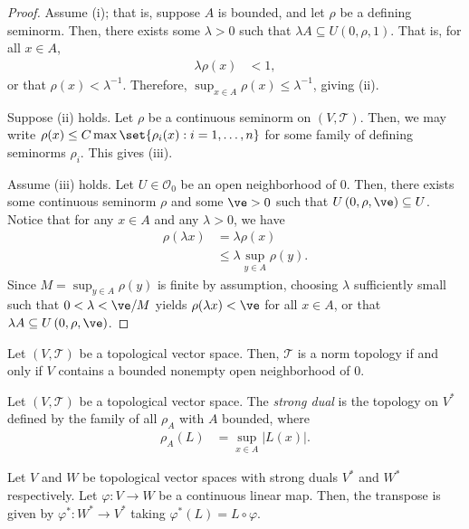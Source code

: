 \documentclass[10pt]{mypackage}
\begin{document}
\begin{proof}
  Assume (i); that is, suppose $A$ is bounded, and let $\rho$ be a defining seminorm. Then, there exists some $\lambda > 0$ such that $\lambda A\subseteq U\left( 0,\rho,1 \right)$. That is, for all $x\in A$,
  \begin{align*}
    \lambda \rho(x) &< 1,
  \end{align*}
  or that $\rho(x) < \lambda^{-1}$. Therefore, $\sup_{x\in A}\rho(x) \leq \lambda^{-1}$, giving (ii).

  Suppose (ii) holds. Let $\rho$ be a continuous seminorm on $\left( V,\mathcal{T} \right)$. Then, we may write $\rho(x) \leq C\max\set{\rho_i(x) : i=1,\dots,n}$ for some family of defining seminorms $\rho_i$. This gives (iii).

  Assume (iii) holds. Let $U\in \mathcal{O}_0$ be an open neighborhood of $0$. Then, there exists some continuous seminorm $\rho$ and some $\ve > 0$ such that $U\left( 0,\rho,\ve \right)\subseteq U$. Notice that for any $x\in A$ and any $\lambda > 0$, we have
  \begin{align*}
    \rho\left( \lambda x \right) &= \lambda \rho(x)\\
                                 &\leq \lambda \sup_{y\in A}\rho(y).
  \end{align*}
  Since $M = \sup_{y\in A}\rho(y)$ is finite by assumption, choosing $\lambda$ sufficiently small such that $0 < \lambda < \ve/M$ yields $\rho(\lambda x) < \ve$ for all $x\in A$, or that $\lambda A \subseteq U\left( 0,\rho,\ve \right)$.
\end{proof}
\begin{theorem}
  Let $\left( V,\mathcal{T} \right)$ be a topological vector space. Then, $\mathcal{T}$ is a norm topology if and only if $V$ contains a bounded nonempty open neighborhood of $0$.
\end{theorem}
\begin{definition}
  Let $\left( V,\mathcal{T} \right)$ be a topological vector space. The \textit{strong dual} is the topology on $V^{\ast}$ defined by the family of all $\rho_A$ with $A$ bounded, where
  \begin{align*}
    \rho_A(L) &= \sup_{x\in A} \left\vert L(x) \right\vert.
  \end{align*}
\end{definition}
\begin{definition}
  Let $V$ and $W$ be topological vector spaces with strong duals $V^{\ast}$ and $W^{\ast}$ respectively. Let $\varphi\colon V\rightarrow W$ be a continuous linear map. Then, the transpose is given by $\varphi^{\ast}\colon W^{\ast}\rightarrow V^{\ast}$ taking $\varphi^{\ast}\left( L \right) = L\circ\varphi$.
\end{definition}
\end{document}
